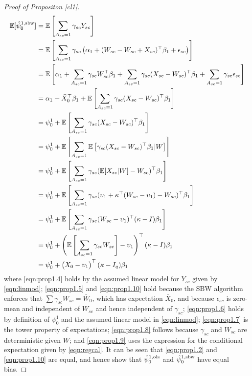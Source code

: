 \begin{proof}[Proof of Propositon \ref{cl1}]
\begin{align}
\nonumber	\mathbb{E}[\hat{\psi}_0^{1, \textup{sbw}}] & = \mathbb{E}\left[ \sum_{A_{sc} = 1} {\gamma}_{sc} Y_{sc}\right] \\
	& = \mathbb{E}\left[ \sum_{A_{sc}=1} {\gamma}_{sc} \left(\alpha_1 + (W_{sc} - W_{sc} + X_{sc})^\top \beta_1 + \epsilon_{sc}\right)\right] \label{eqn:prop1.4}\\
\nonumber	& = \mathbb{E}\left[ \alpha_1 + \sum_{A_{sc} = 1} {\gamma}_{sc} W_{sc}^\top \beta_1 + \sum_{A_{sc}=1} {\gamma}_{sc} (X_{sc} - W_{sc})^\top \beta_1 + \sum_{A_{sc}=1} {\gamma}_{sc} \epsilon_{sc} \right] \\
	& = \alpha_1 + \bar{X}_0^\top\beta_1 + \mathbb{E}\left[ \sum_{A_{sc} = 1} {\gamma}_{sc}(X_{sc} - W_{sc})^\top \beta_1\right] \label{eqn:prop1.5}\\
	& = \psi_0^1 + \mathbb{E} \left[ \sum_{A_{sc} = 1} {\gamma}_{sc}(X_{sc} - W_{sc})^\top \beta_1 \right] \label{eqn:prop1.6} \\
	& = \psi_0^1 + \mathbb{E} \left[ \sum_{A_{sc} = 1} \mathbb{E}\left[ {\gamma}_{sc}(X_{sc} - W_{sc})^\top \beta_1 | W \right] \right] \label{eqn:prop1.7} \\
	& = \psi_0^1 + \mathbb{E} \left[ \sum_{A_{sc} = 1}  {\gamma}_{sc} (\mathbb{E}[X_{sc}|W] - W_{sc})^\top \beta_1 \right] \label{eqn:prop1.8} \\
	& = \psi_0^1 + \mathbb{E} \left[ \sum_{A_{sc} = 1}  {\gamma}_{sc} (\upsilon_1 + \kappa^\top(W_{sc} - \upsilon_1) - W_{sc})^\top \beta_1 \right] \label{eqn:prop1.9} \\
\nonumber	& = \psi_0^1 + \mathbb{E} \left[ \sum_{A_{sc} = 1}  {\gamma}_{sc} (W_{sc} - \upsilon_1)^\top(\kappa - I)\beta_1 \right] \\
\nonumber	& = \psi_0^1 + \left(\mathbb{E}\left[\sum_{A_{sc} = 1} {\gamma}_{sc} W_{sc}\right] - \upsilon_1\right)^\top(\kappa - I)\beta_1  \\
	& = \psi_0^1 + \left(\bar{X}_0 - \upsilon_1\right)^\top(\kappa - I_q)\beta_1  \label{eqn:prop1.10}
\end{align}
%
where \eqref{eqn:prop1.4} holds by the assumed linear model for $Y_{sc}$ given by  \eqref{eqn:linmod}; \eqref{eqn:prop1.5} and \eqref{eqn:prop1.10} hold because the SBW algorithm enforces that $\sum \gamma_{sc} W_{sc} = \bar{W}_0$, which has expectation $\bar{X}_0$, and because $\epsilon_{sc}$ is zero-mean and independent of $W_{sc}$ and hence independent of $\gamma_{sc}$; \eqref{eqn:prop1.6} holds by definition of $\psi_0^1$ and the assumed linear model in \eqref{eqn:linmod}; \eqref{eqn:prop1.7} is the tower property of expectations; \eqref{eqn:prop1.8} follows because $\gamma_{sc}$ and $W_{sc}$ are deterministic given $W$; and \eqref{eqn:prop1.9} uses the expression for the conditional expectation given by \eqref{eqn:regcal}. It can be seen that \eqref{eqn:prop1.2} and \eqref{eqn:prop1.10} are equal, and hence show that $\hat{\psi}_0^{1,\textup{ols}}$ and $\hat{\psi}_0^{1, \textup{sbw}}$ have equal bias.


\end{proof}
